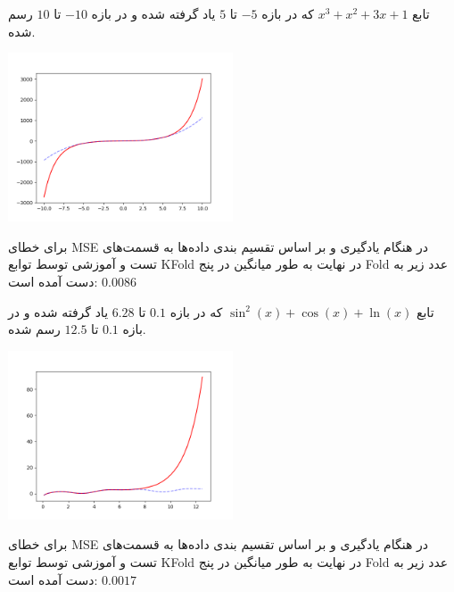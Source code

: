 \documentclass[12pt,titlepage,a4page , tikz , multi,table , svgnames,xcdraw]{article}
\begin{document}
\newpage

\hrulefill

تابع
 $x^3 + x^2 + 3x + 1$
  که در بازه $-5$ تا $5$ یاد گرفته شده و در بازه $-10$ تا $10$ رسم شده.


\begin{center}

 \includegraphics[width=0.5\textwidth]{pictures/3.png}

\end{center}

برای خطای MSE در هنگام یادگیری و بر اساس تقسیم بندی داده‌ها به قسمت‌های تست و آموزشی توسط توابع KFold در نهایت به طور میانگین در پنج Fold عدد زیر به دست آمده است:
$0.0086$




\hrulefill

تابع
 $\sin^{2} (x) + \cos(x) + \ln(x)$
  که در بازه $0.1$ تا $6.28$ یاد گرفته شده و در بازه $0.1$ تا $12.5$ رسم شده.


\begin{center}

 \includegraphics[width=0.5\textwidth]{pictures/4.png}

\end{center}

برای خطای MSE در هنگام یادگیری و بر اساس تقسیم بندی داده‌ها به قسمت‌های تست و آموزشی توسط توابع KFold در نهایت به طور میانگین در پنج Fold عدد زیر به دست آمده است:
$ 0.0017$



\hrulefill
\end{document}
